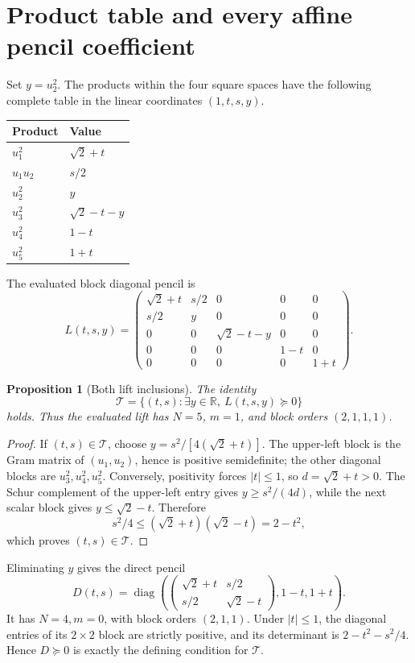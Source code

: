 \documentclass[11pt]{article}
\newcommand{\R}{\mathbb R}
\newcommand{\T}{\mathcal T}
\newtheorem{proposition}{Proposition}
\begin{document}
\section{Product table and every affine pencil coefficient}
Set $y=u_2^2$. The products within the four square spaces have the following complete table in the linear coordinates $(1,t,s,y)$.
\begin{center}
\begin{tabular}{ll}
\toprule
Product&Value\\\midrule
$u_1^2$&$\sqrt2+t$\\
$u_1u_2$&$s/2$\\
$u_2^2$&$y$\\
$u_3^2$&$\sqrt2-t-y$\\
$u_4^2$&$1-t$\\
$u_5^2$&$1+t$\\\bottomrule
\end{tabular}
\end{center}
The evaluated block diagonal pencil is
\begin{equation}\label{eq:lift}
 L(t,s,y)=
 \begin{pmatrix}
 \sqrt2+t&s/2&0&0&0\\
 s/2&y&0&0&0\\
 0&0&\sqrt2-t-y&0&0\\
 0&0&0&1-t&0\\
 0&0&0&0&1+t
 \end{pmatrix}.
\end{equation}

\begin{proposition}[Both lift inclusions]\label{prop:lift}
The identity
\[
 \T=\{(t,s):\exists y\in\R,\ L(t,s,y)\succeq0\}
\]
holds. Thus the evaluated lift has $N=5$, $m=1$, and block orders $(2,1,1,1)$.
\end{proposition}
\begin{proof}
If $(t,s)\in\T$, choose $y=s^2/[4(\sqrt2+t)]$. The upper-left block is the Gram matrix of $(u_1,u_2)$, hence is positive semidefinite; the other diagonal blocks are $u_3^2,u_4^2,u_5^2$. Conversely, positivity forces $|t|\le1$, so $d=\sqrt2+t>0$. The Schur complement of the upper-left entry gives $y\ge s^2/(4d)$, while the next scalar block gives $y\le\sqrt2-t$. Therefore
\[
 s^2/4\le(\sqrt2+t)(\sqrt2-t)=2-t^2,
\]
which proves $(t,s)\in\T$.
\end{proof}

Eliminating $y$ gives the direct pencil
\begin{equation}\label{eq:direct}
 D(t,s)=\operatorname{diag}\left(
 \begin{pmatrix}\sqrt2+t&s/2\\s/2&\sqrt2-t\end{pmatrix},
 1-t,1+t\right).
\end{equation}
It has $N=4,m=0$, with block orders $(2,1,1)$. Under $|t|\le1$, the diagonal entries of its $2\times2$ block are strictly positive, and its determinant is $2-t^2-s^2/4$. Hence $D\succeq0$ is exactly the defining condition for $\T$.
\end{document}
